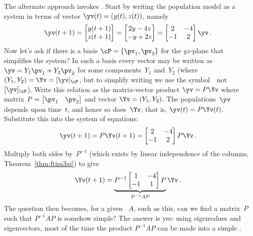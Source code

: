The alternate approach invokes .
Start by writing the population model as a system in terms of vector \(\yv(t)=(y(t),z(t))\), namely
\begin{equation*}
\yv(t+1)=\begin{bmatrix} y(t+1)\\z(t+1) \end{bmatrix}
=\begin{bmatrix} 2y-4z\\-y+2z \end{bmatrix}
=\begin{bmatrix} 2&-4\\-1&2 \end{bmatrix}\yv\,.
\end{equation*}
Now let's ask if there is a basis \(\cP=\{\pv_1,\pv_2\}\) for the \(yz\)-plane that simplifies the system?
In such a basis every vector may be written as \(\yv=Y_1\pv_1+Y_2\pv_2\) for some components~\(Y_1\) and~\(Y_2\) (where \((Y_1,Y_2)=\Yv=[\yv]_\cP\), but to simplify writing we use the symbol~\Yv\ not~\([\yv]_\cP\)).
Write this relation as the matrix-vector product \(\yv=P\Yv\) where matrix \(P=\begin{bmatrix} \pv_1&\pv_2 \end{bmatrix}\) and vector \(\Yv=(Y_1,Y_2)\).
The populations~\(\yv\) depends upon time~\(t\), and hence so does~\(\Yv\); that is, \(\yv(t)=P\Yv(t)\).
Substitute this into the system of equations:
\begin{equation*}
\yv(t+1)=P\Yv(t+1)=\begin{bmatrix} 2&-4\\-1&2 \end{bmatrix}P\Yv\,.
\end{equation*}
Multiply both sides by~\(P^{-1}\) (which exists by linear independence of the columns, Theorem~\ref{thm:ftim3xi}) to give
\begin{equation*}
\Yv(t+1)=\underbrace{P^{-1}\begin{bmatrix} 1&-4\\-1&1 \end{bmatrix}P}_{P^{-1}AP}\Yv\,.
\end{equation*}
The question then becomes, for a given ~\(A\), such as this, can we find a matrix~\(P\) such that \(P^{-1}AP\) is somehow simple?
The answer is yes: using eigenvalues and eigenvectors, most of the time the product \(P^{-1}AP\) can be made into a simple .




